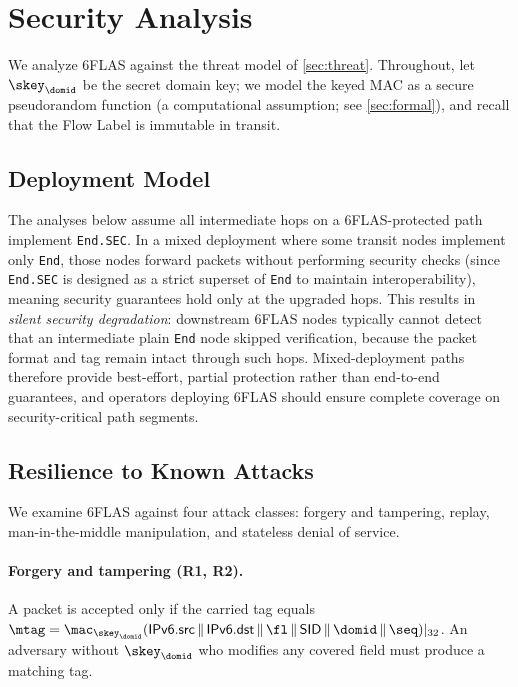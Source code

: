 \section{Security Analysis}
\label{sec:security}

We analyze 6FLAS against the threat model of \cref{sec:threat}. Throughout, let
$\skey_\domid$ be the secret domain key; we model the keyed MAC as a secure
pseudorandom function (a computational assumption; see \cref{sec:formal}), and
recall that the Flow Label is immutable in transit.

\subsection{Deployment Model}
The analyses below assume all intermediate hops on a 6FLAS-protected
path implement \texttt{End.SEC}. In a mixed deployment where some transit nodes
implement only \texttt{End}, those nodes forward packets without performing security checks (since \texttt{End.SEC} is designed as a strict superset of \texttt{End} to maintain interoperability), meaning security guarantees hold only at the upgraded hops. This results in \emph{silent security degradation}: downstream 6FLAS nodes typically cannot detect that an intermediate plain \texttt{End} node skipped verification, because the packet format and tag remain intact through such hops. Mixed-deployment paths therefore provide best-effort, partial protection rather than end-to-end guarantees, and operators deploying 6FLAS should ensure complete coverage on security-critical path segments.

\subsection{Resilience to Known Attacks}
\label{sec:attacks}

We examine 6FLAS against four attack classes: forgery and tampering, replay, man-in-the-middle manipulation, and stateless denial of service.

\paragraph{Forgery and tampering (R1, R2).}
A packet is accepted only if the carried tag equals
$\mtag=\mac_{\skey_\domid}(\textsf{IPv6.src} \,\|\, \textsf{IPv6.dst} \,\|\, \fl\,\|\,\textsf{SID}\,\|\,\domid\,\|\,\seq)|_{32}$. An adversary without $\skey_\domid$ who
modifies any covered field must produce a matching tag.

